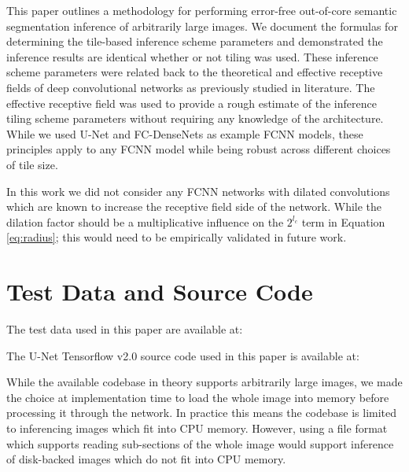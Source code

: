 \documentclass[runningheads]{llncs}
\newif\ifcamera
\begin{document}
This paper outlines a methodology for performing error-free out-of-core semantic segmentation inference of arbitrarily large images. 
We document the formulas for determining the tile-based inference scheme parameters and demonstrated the inference results are identical whether or not tiling was used. These inference scheme parameters were related back to the theoretical and effective receptive fields of deep convolutional networks as previously studied in literature. The effective receptive field was used to provide a rough estimate of the inference tiling scheme parameters without requiring any knowledge of the architecture.
While we used U-Net and FC-DenseNets as example FCNN models, these principles apply to any FCNN model while being robust across different choices of tile size. 

In this work we did not consider any FCNN networks with dilated convolutions which are known to increase the receptive field side of the network. While the dilation factor should be a multiplicative influence on the $2^{l_c}$ term in Equation \ref{eq:radius}; this would need to be empirically validated in future work. 



\section{Test Data and Source Code}
The test data used in this paper are available at: 
\ifcamera
\\\url{https://isg.nist.gov/deepzoomweb/data/stemcellpluripotency}. 
\fi

The U-Net Tensorflow v2.0 source code used in this paper is available at: 
\ifcamera
\\\url{https://github.com/usnistgov/semantic-segmentation-unet/tree/ooc-inference}.
\fi

While the available codebase in theory supports arbitrarily large images, we made the choice at implementation time to load the whole image into memory before processing it through the network. In practice this means the codebase is limited to inferencing images which fit into CPU memory. However, using a file format which supports reading sub-sections of the whole image would support inference of disk-backed images which do not fit into CPU memory. 
\end{document}
